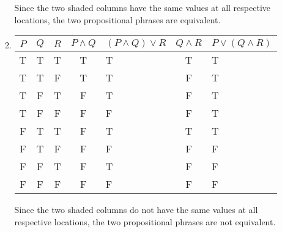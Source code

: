 \documentclass[12pt,letterpaper]{article}
\begin{document}
\begin{enumerate}[label=Problem \arabic*]
\begin{enumerate}[label=\arabic*.]
          Since the two shaded columns have the same values at all respective locations,
          the two propositional phrases are equivalent.
        \item

          \begin{tabular}{c | c | c | c | g | c | g}
            $P$ & $Q$ & $R$ & $P \wedge Q$ & $(P \wedge Q) \vee R$ & $Q \wedge R$ & $P \vee (Q \wedge R)$ \\
            \hline
            T & T & T & T & T & T & T \\
            T & T & F & T & T & F & T \\
            T & F & T & F & T & F & T \\
            T & F & F & F & F & F & T \\
            F & T & T & F & T & T & T \\
            F & T & F & F & F & F & F \\
            F & F & T & F & T & F & F \\
            F & F & F & F & F & F & F \\
          \end{tabular}

          Since the two shaded columns do not have the same values at all respective locations,
          the two propositional phrases are not equivalent.
      \end{enumerate}
  \end{enumerate}
\end{document}
